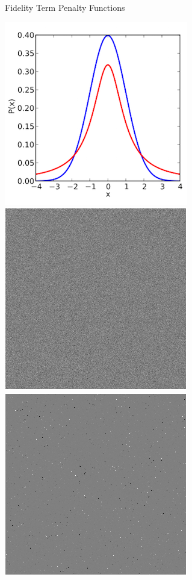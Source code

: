 \documentclass[12pt]{beamer}
\begin{document}
\begin{frame}{Fidelity Term Penalty Functions}

\vspace{-4ex}
\begin{center}
\includegraphics[scale=0.3]{../figures/dist_t_vs_gauss} \quad
\includegraphics[scale=0.3]{../figures/gaussian_noise.png} \quad
\includegraphics[scale=0.3]{../figures/student_t_noise.png}
\end{center}


\end{frame}
\end{document}
